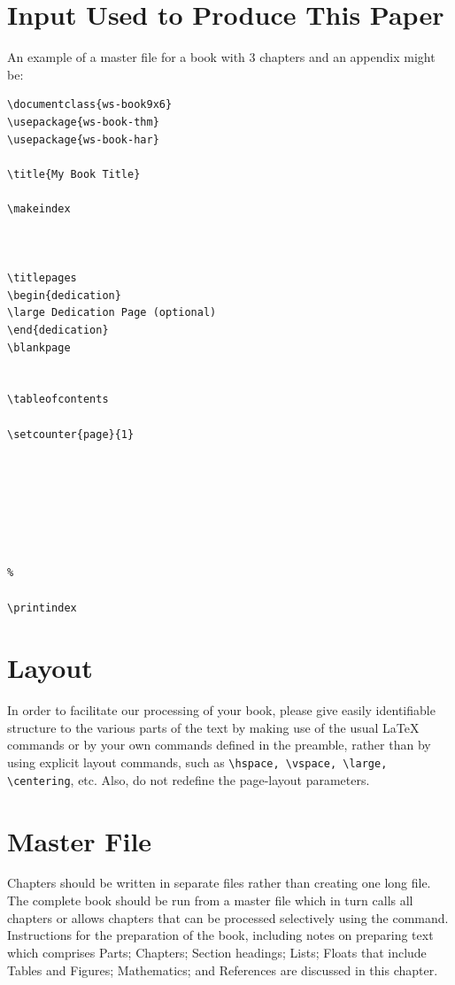 \section{Input Used to Produce This Paper}
An example of a master file for a book with 3 chapters and an
appendix might be:
\begin{verbatim}
\documentclass{ws-book9x6}
\usepackage{ws-book-thm}
\usepackage{ws-book-har}

\title{My Book Title}

\makeindex



\titlepages
\begin{dedication}
\large Dedication Page (optional)
\end{dedication}
\blankpage


\tableofcontents

\setcounter{page}{1}







%

\printindex

\end{verbatim}

\vfill

\eject

\section{Layout}
In order to facilitate our processing of your book, please give
easily identifiable structure to the various parts of the text by
making use of the usual \LaTeX{} commands or by your own commands
defined in the preamble, rather than by using explicit layout
commands, such as \verb|\hspace, \vspace, \large, \centering|, etc.
Also, do not redefine the page-layout parameters.

\section{Master File}
Chapters should be written in separate files rather than creating
one long file. The complete book should be run from a master
file which in turn calls all chapters or allows
chapters that can be processed selectively using the \verb||
command. Instructions for the preparation of the book, including
notes on preparing text which comprises Parts; Chapters; Section
headings; Lists; Floats that include Tables and Figures;
Mathematics; and References are discussed in this chapter.

